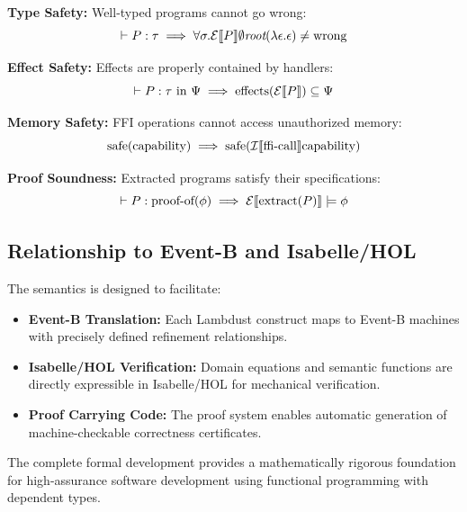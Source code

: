 \textbf{Type Safety:} Well-typed programs cannot go wrong:
$$\vdash P : \tau \implies \forall \sigma. \hbox{$\cal E$}\llbracket P\rrbracket \emptyset \textit{root} (\lambda\epsilon.\epsilon) \neq \text{wrong}$$

\textbf{Effect Safety:} Effects are properly contained by handlers:
$$\vdash P : \tau \text{ in } \Psi \implies \text{effects}(\hbox{$\cal E$}\llbracket P\rrbracket) \subseteq \Psi$$

\textbf{Memory Safety:} FFI operations cannot access unauthorized memory:
$$\text{safe}(\text{capability}) \implies \text{safe}(\hbox{$\cal I$}\llbracket\text{ffi-call}\rrbracket \text{capability})$$

\textbf{Proof Soundness:} Extracted programs satisfy their specifications:
$$\vdash P : \text{proof-of}(\phi) \implies \hbox{$\cal E$}\llbracket\text{extract}(P)\rrbracket \models \phi$$

\subsection{Relationship to Event-B and Isabelle/HOL}

The semantics is designed to facilitate:

\begin{itemize}
\item \textbf{Event-B Translation:} Each Lambdust construct maps to Event-B machines with precisely defined refinement relationships.
\item \textbf{Isabelle/HOL Verification:} Domain equations and semantic functions are directly expressible in Isabelle/HOL for mechanical verification.
\item \textbf{Proof Carrying Code:} The proof system enables automatic generation of machine-checkable correctness certificates.
\end{itemize}

The complete formal development provides a mathematically rigorous foundation for high-assurance software development using functional programming with dependent types.

\egroup